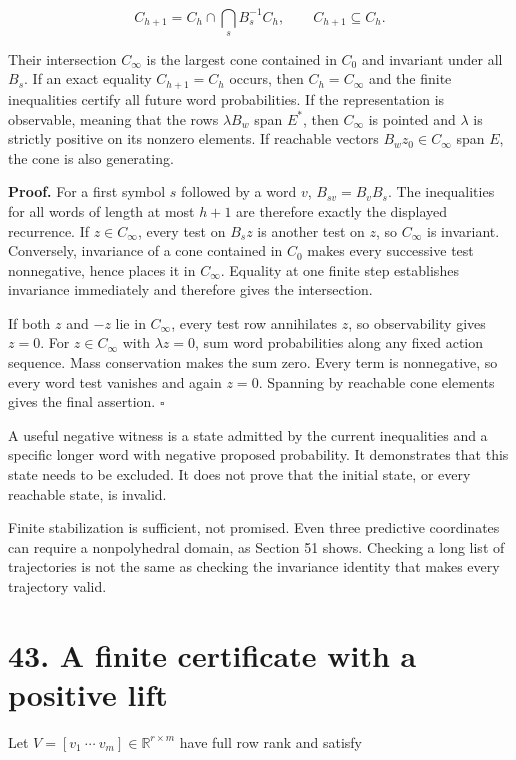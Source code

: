 \documentclass[11pt,letterpaper]{article}
\begin{document}
\[
C_{h+1}=C_h\cap\bigcap_s B_s^{-1}C_h,
\qquad C_{h+1}\subseteq C_h.
\]

Their intersection \(C_\infty\) is the largest cone contained in \(C_0\)
and invariant under all \(B_s\). If an exact equality \(C_{h+1}=C_h\)
occurs, then \(C_h=C_\infty\) and the finite inequalities certify all
future word probabilities. If the representation is observable, meaning
that the rows \(\lambda B_w\) span \(E^*\), then \(C_\infty\) is pointed
and \(\lambda\) is strictly positive on its nonzero elements. If
reachable vectors \(B_wz_0\in C_\infty\) span \(E\), the cone is also
generating.

\textbf{Proof.} For a first symbol \(s\) followed by a word \(v\),
\(B_{sv}=B_vB_s\). The inequalities for all words of length at most
\(h+1\) are therefore exactly the displayed recurrence. If
\(z\in C_\infty\), every test on \(B_sz\) is another test on \(z\), so
\(C_\infty\) is invariant. Conversely, invariance of a cone contained in
\(C_0\) makes every successive test nonnegative, hence places it in
\(C_\infty\). Equality at one finite step establishes invariance
immediately and therefore gives the intersection.

If both \(z\) and \(-z\) lie in \(C_\infty\), every test row annihilates
\(z\), so observability gives \(z=0\). For \(z\in C_\infty\) with
\(\lambda z=0\), sum word probabilities along any fixed action sequence.
Mass conservation makes the sum zero. Every term is nonnegative, so
every word test vanishes and again \(z=0\). Spanning by reachable cone
elements gives the final assertion. \(\square\)

A useful negative witness is a state admitted by the current
inequalities and a specific longer word with negative proposed
probability. It demonstrates that this state needs to be excluded. It
does not prove that the initial state, or every reachable state, is
invalid.

Finite stabilization is sufficient, not promised. Even three predictive
coordinates can require a nonpolyhedral domain, as Section 51 shows.
Checking a long list of trajectories is not the same as checking the
invariance identity that makes every trajectory valid.

\section{43. A finite certificate with a positive
lift}\label{a-finite-certificate-with-a-positive-lift}

Let \(V=[v_1\ \cdots\ v_m]\in\mathbb R^{r\times m}\) have full row rank
and satisfy
\end{document}
